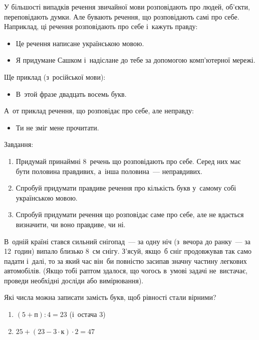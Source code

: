 \problem
У більшості випадків речення звичайної мови розповідають про людей, об'єкти,
переповідають думки.
Але бувають речення, що розповідають самі про себе.
Наприклад, ці речення розповідають про себе і~кажуть правду:
\begin{itemize}
  \item Це речення написане українською мовою.
  \item Я придумане Сашком і~надіслане до тебе
  за допомогою комп’ютерної мережі.
\end{itemize}
Ще приклад (з~російської мови):
\begin{itemize}
  \item В~этой фразе двадцать восемь букв.
\end{itemize}
А~от приклад речення, що розповідає про себе, але неправду:
\begin{itemize}
  \item Ти не зміг мене прочитати.
\end{itemize}
Завдання:
\begin{enumerate}
  \item Придумай принаймні 8~речень що розповідають про себе.
  Серед них має бути половина правдивих, а~інша половина~--- неправдивих.
  \item Спробуй придумати правдиве речення про кількість букв
  у~самому собі українською мовою.
  \item Спробуй придумати речення що розповідає саме про себе,
  але не вдається визначити, чи воно правдиве, чи ні.
\end{enumerate}


\problem
В~одній країні стався сильний снігопад~--- за одну ніч
(з~вечора до ранку~--- за 12~годин) випало близько 8~см снігу.
З'ясуй, якщо~б сніг продовжував так само падати і~далі,
то за який час він~би повністю засипав значну частину легкових автомобілів.
(Якщо тобі раптом здалося, що чогось в~умові задачі не~вистачає,
проведи необхідні досліди або вимірювання).


\problem
Які числа можна записати замість букв, щоб рівності стали вірними?
\begin{enumerate}
  \item $(5 + \textit{п}) : 4 = 23$ (і~остача 3)
  \item $25 + (23 - 3 \cdot \textit{к}) \cdot 2 = 47$
\end{enumerate}


